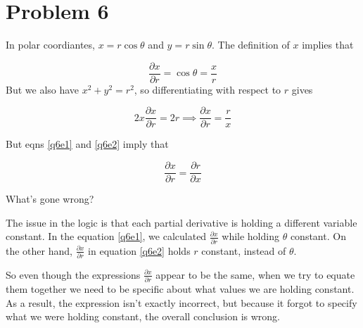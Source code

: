 \documentclass{article}
\begin{document}
    \section*{Problem 6}

    In polar coordiantes, $x = r\cos \theta$ and $y = r\sin \theta$. The definition of $x$ implies that 

    \begin{equation}\label{q6e1}
        \frac{\partial x}{\partial r} = \cos \theta = \frac{x}{r} 
    \end{equation}
    But we also have $x^2 + y^2 = r^2$, so differentiating with respect to $r$ gives 

    \begin{equation}\label{q6e2}
        2x \frac{\partial x}{\partial r} = 2r \implies \frac{\partial x}{\partial r} = \frac{r}{x}
    \end{equation}

    But eqns \ref{q6e1} and \ref{q6e2} imply that 

    \[ \frac{\partial x}{\partial r} = \frac{\partial r}{\partial x}\] 

    What's gone wrong?


    \begin{solution}
        The issue in the logic is that each partial derivative is holding a different variable constant. In the equation \ref{q6e1}, we calculated $\frac{\partial x}{\partial r}$ while holding $\theta$ constant. On the other hand, $\frac{\partial x}{\partial r}$ in equation \ref{q6e2} holds $r$ constant, instead of $\theta$. 

        So even though the expressions $\frac{\partial x}{\partial r}$ appear to be the same, when we try to equate them together we need to be specific about what values we are holding constant. As a result, the expression isn't exactly incorrect, but because it forgot to specify what we were holding constant, the overall conclusion is wrong.
    \end{solution}
    
\end{document}
